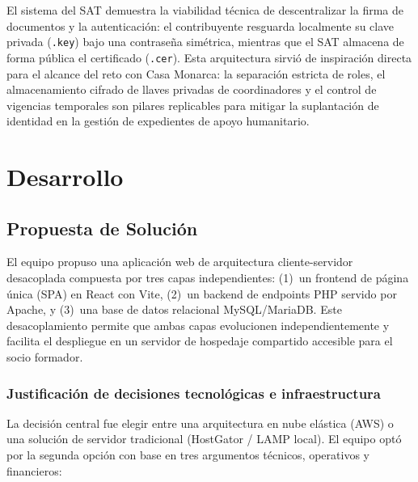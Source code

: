 \documentclass[10pt,letterpaper]{report}
\begin{document}
El sistema del SAT demuestra la viabilidad técnica de descentralizar la firma de documentos y la autenticación: el contribuyente resguarda localmente su clave privada (\texttt{.key}) bajo una contraseña simétrica, mientras que el SAT almacena de forma pública el certificado (\texttt{.cer}). Esta arquitectura sirvió de inspiración directa para el alcance del reto con Casa Monarca: la separación estricta de roles, el almacenamiento cifrado de llaves privadas de coordinadores y el control de vigencias temporales son pilares replicables para mitigar la suplantación de identidad en la gestión de expedientes de apoyo humanitario.

\chapter{Desarrollo}

\section{Propuesta de Solución}
\label{sec:propuesta}

El equipo propuso una aplicación web de arquitectura cliente-servidor desacoplada compuesta por tres capas independientes: (1)~un frontend de página única (SPA) en React con Vite, (2)~un backend de endpoints PHP servido por Apache, y (3)~una base de datos relacional MySQL/MariaDB. Este desacoplamiento permite que ambas capas evolucionen independientemente y facilita el despliegue en un servidor de hospedaje compartido accesible para el socio formador.

\subsection{Justificación de decisiones tecnológicas e infraestructura}

La decisión central fue elegir entre una arquitectura en nube elástica (AWS) o una solución de servidor tradicional (HostGator / LAMP local). El equipo optó por la segunda opción con base en tres argumentos técnicos, operativos y financieros:
\end{document}
